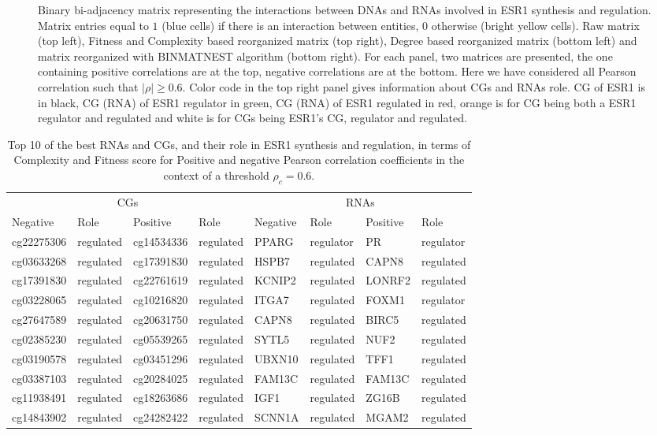 \documentclass[10pt,a4paper]{article}
\begin{document}
\begin{figure}[h!]
{}
\caption{\label{fig:fig2}Binary bi-adjacency matrix representing the interactions between DNAs and RNAs involved in ESR1 synthesis and regulation. Matrix entries equal to $1$ (blue cells) if there is an interaction between entities, $0$ otherwise (bright yellow cells). Raw matrix (top left), Fitness and Complexity based reorganized matrix (top right), Degree based reorganized matrix (bottom left) and matrix reorganized with BINMATNEST algorithm (bottom right). For each panel, two matrices are presented, the one containing positive correlations are at the top, negative correlations are at the bottom. Here we have considered all Pearson correlation such that $|\rho| \geq 0.6$. Color code in the top right panel gives information about CGs and RNAs role. CG of ESR1 is in black, CG (RNA) of ESR1 regulator in green, CG (RNA) of ESR1 regulated in red, orange is for CG being both a ESR1 regulator and regulated and white is for CGs being ESR1's CG, regulator and regulated.}
\end{figure}
 \begin{table}[h!]
\centering
\caption{\label{tab:tab3}Top 10 of the best RNAs and CGs, and their role in ESR1 synthesis and regulation, in terms of Complexity and Fitness score for Positive and negative Pearson correlation coefficients in the context of a threshold $\rho_{c} = 0.6$.}
\begin{tabular}{|ll|ll|ll|ll|}
\cline{1-8}
\multicolumn{4}{|c}{CGs}&\multicolumn{4}{c|}{RNAs}\\
\cline{1-8}
Negative & Role & Positive & Role & Negative & Role & Positive & Role\\
\cline{1-8}
cg22275306 & regulated & cg14534336 & regulated & PPARG & regulator & PR & regulator\\
cg03633268 & regulated & cg17391830 & regulated & HSPB7 & regulated & CAPN8 & regulated\\
cg17391830 & regulated & cg22761619 & regulated & KCNIP2 & regulated & LONRF2 & regulated\\
cg03228065 & regulated & cg10216820 & regulated & ITGA7 & regulated & FOXM1 & regulator\\
cg27647589 & regulated & cg20631750 & regulated & CAPN8 & regulated & BIRC5 & regulated\\
cg02385230 & regulated & cg05539265 & regulated & SYTL5 & regulated & NUF2 & regulated\\
cg03190578 & regulated & cg03451296 & regulated & UBXN10 & regulated & TFF1 & regulated\\
cg03387103 & regulated & cg20284025 & regulated & FAM13C & regulated & FAM13C & regulated\\
cg11938491 & regulated & cg18263686 & regulated & IGF1 & regulated & ZG16B & regulated\\
cg14843902 & regulated & cg24282422 & regulated & SCNN1A & regulated & MGAM2 & regulated\\
\cline{1-8}
\end{tabular}
\end{table}
\end{document}
